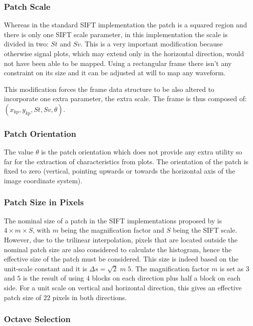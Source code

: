 \documentclass[review]{elsarticle}
\begin{document}
\subsubsection{Patch Scale}

Whereas in the standard SIFT implementation the patch is a squared region and there is only one SIFT scale parameter, in this implementation the scale is divided in two: $St$ and $Sv$.  This is a very important modification because otherwise signal plots, which may extend only in the horizontal direction, would not have been able to be mapped.  Using a rectangular frame there isn't any constraint on its size and it can be adjusted at will to map any waveform.

This modification forces the frame data structure to be also altered to incorporate one extra parameter, the extra scale.  The frame is thus composed of: $ ( x_{kp}, y_{kp}, St, Sv, \theta ) $.  

\subsubsection{Patch Orientation}

The value $\theta$ is the patch orientation which does not provide any extra utility so far for the extraction of characteristics from plots.  The orientation of the patch is fixed to zero (vertical, pointing upwards or towards the horizontal axis of the image coordinate system).

\subsubsection{Patch Size in Pixels}

The nominal size of a patch in the SIFT implementations proposed by \citep{Lowe2004} is $4 \times m \times S$, with $m$ being the magnification factor and $S$ being the SIFT scale.  However, due to the trilinear interpolation, pixels that are located outside the nominal patch size are also considered to calculate the histogram, hence the effective size of the patch must be considered. This size is indeed based on the unit-scale constant and it is $\Delta s  = \sqrt{2} \; m \; 5$.  The magnification factor $m$ is set as $3$ and $5$ is the result of using $4$ blocks on each direction plus half a block on each side.  For a unit scale on vertical and horizontal direction, this gives an effective patch size of $22$ pixels in both directions.

\subsubsection{Octave Selection}
\end{document}
